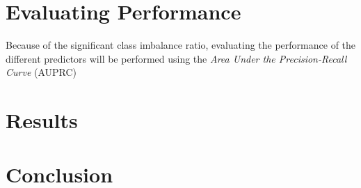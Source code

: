\documentclass[10pt,conference]{IEEEtran}
\begin{document}
\section{Evaluating Performance}
  Because of the significant class imbalance ratio, evaluating the performance of the different predictors will be performed using the \emph{Area Under the Precision-Recall Curve} (AUPRC)
\section{Results}


\section{Conclusion}

\nocite{*}




\vspace{12pt}
\end{document}
